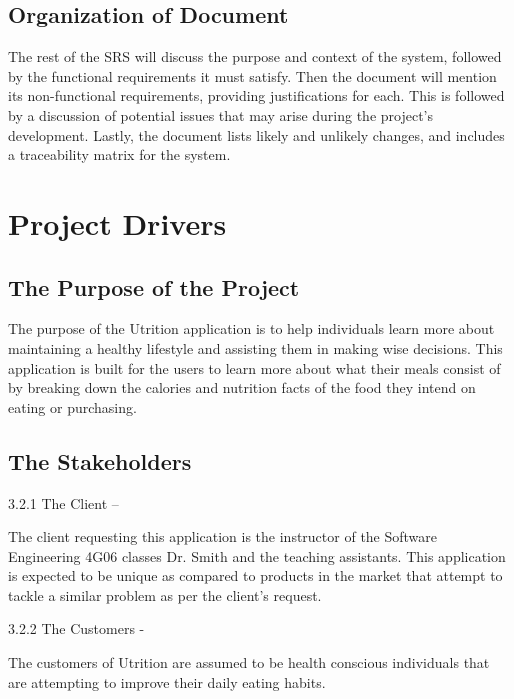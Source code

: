 \documentclass[12pt]{article}
\begin{document}
\subsection{Organization of Document}

The rest of the SRS will discuss the purpose and context of the system, 
followed by the functional requirements it must satisfy. Then the document will 
mention its non-functional requirements, providing justifications for each. 
This is followed by a discussion of potential issues that may arise during the 
project's development. Lastly, the document lists likely and unlikely 
changes, and includes a traceability matrix for the system.


\section{Project Drivers }

\subsection{The Purpose of the Project}

The purpose of the Utrition application is to help individuals learn more about maintaining a healthy lifestyle and assisting them in making wise decisions. This application is built for the users to learn more about what their meals consist of by breaking down the calories and nutrition facts of the food they intend on eating or purchasing.  

\subsection{The Stakeholders }

3.2.1 The Client –  

The client requesting this application is the instructor of the Software Engineering 4G06 classes Dr. Smith and the teaching assistants. This application is expected to be unique as compared to products in the market that attempt to tackle a similar problem as per the client's request.  

3.2.2 The Customers -  

The customers of Utrition are assumed to be health conscious individuals that are attempting to improve their daily eating habits. 
\end{document}
